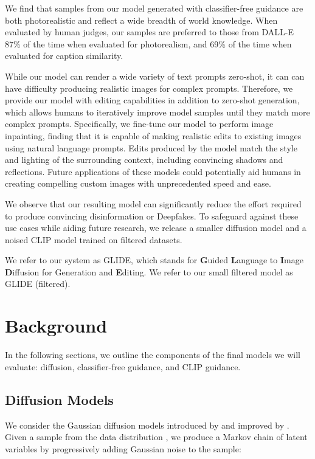 \documentclass{article}
\newcommand{\modelname}{GLIDE}
\begin{document}
We find that samples from our model generated with classifier-free guidance are both photorealistic and reflect a wide breadth of world knowledge. When evaluated by human judges, our samples are preferred to those from DALL-E \citep{dalle} 87\% of the time when evaluated for photorealism, and 69\% of the time when evaluated for caption similarity.  

While our model can render a wide variety of text prompts zero-shot, it can can have difficulty producing realistic images for complex prompts. Therefore, we provide our model with editing capabilities in addition to zero-shot generation, which allows humans to iteratively improve model samples until they match more complex prompts. Specifically, we fine-tune our model to perform image inpainting, finding that it is capable of making realistic edits to existing images using natural language prompts. Edits produced by the model match the style and lighting of the surrounding context, including convincing shadows and reflections. Future applications of these models could potentially aid humans in creating compelling custom images with unprecedented speed and ease.

We observe that our resulting model can significantly reduce the effort required to produce convincing disinformation or Deepfakes. To safeguard against these use cases while aiding future research, we release a smaller diffusion model and a noised CLIP model trained on filtered datasets.

We refer to our system as \modelname{}, which stands for \textbf{G}uided \textbf{L}anguage to \textbf{I}mage \textbf{D}iffusion for Generation and \textbf{E}diting. We refer to our small filtered model as \modelname{} (filtered).

\section{Background}
\label{sec:background}

In the following sections, we outline the components of the final models we will evaluate: diffusion, classifier-free guidance, and CLIP guidance.

\subsection{Diffusion Models}
\label{sec:diffusionbackground}

We consider the Gaussian diffusion models introduced by \citet{dickstein} and improved by \citet{scorematching,ddpm}. Given a sample from the data distribution , we produce a Markov chain of latent variables  by progressively adding Gaussian noise to the sample:
\end{document}
